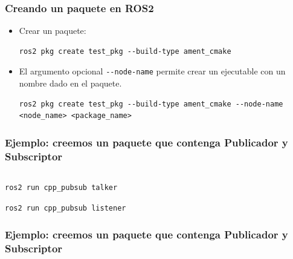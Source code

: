 \begin{frame}[fragile]
	\frametitle{Creando un paquete en ROS2}
    \begin{itemize}
        \item Crear un paquete:
        \begin{lstlisting}[style=bash] 
ros2 pkg create test_pkg --build-type ament_cmake
        \end{lstlisting}

        \item El argumento opcional \lstinline[style=bash]{--node-name} permite crear un ejecutable con un nombre dado en el paquete.
        \begin{lstlisting}[style=bash] 
ros2 pkg create test_pkg --build-type ament_cmake --node-name <node_name> <package_name>
        \end{lstlisting}
    \end{itemize}	
\end{frame}


\begin{frame}[fragile]
	\frametitle{Ejemplo: creemos un paquete que contenga Publicador y Subscriptor}
    
    \begin{columns}
        \begin{column}{0.5\textwidth}
            
        \end{column}
        \begin{column}{0.5\textwidth}
            
        \end{column}
    \end{columns}
	
\begin{lstlisting}[style=bash,basicstyle=\footnotesize] 
ros2 run cpp_pubsub talker
\end{lstlisting}
\begin{lstlisting}[style=bash,basicstyle=\footnotesize] 
ros2 run cpp_pubsub listener
\end{lstlisting}
	
\end{frame}

\begin{frame}[fragile]
    \frametitle{Ejemplo: creemos un paquete que contenga Publicador y Subscriptor}
    
    \begin{columns}
        \begin{column}{0.5\textwidth}
            
        \end{column}
        \begin{column}{0.5\textwidth}
            
        \end{column}
    \end{columns}
    
\end{frame}

